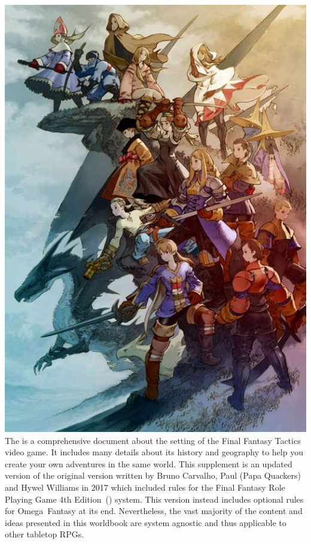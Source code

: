 %
\\\\
%
\includegraphics[width=\columnwidth]{./art/worldbook/everyone.jpg}
%
\ofrow
%
The  is a comprehensive document about the setting of the Final Fantasy Tactics video game.
It includes many details about its history and geography to help you create your own adventures in the same world.
This supplement is an updated version of the original version written by Bruno Carvalho, Paul (Papa Quackers) and Hywel Williams in 2017 which included rules for the Final Fantasy Role Playing Game 4th Edition~() system.
This version instead includes optional rules for Omega~Fantasy at its end.
Nevertheless, the vast majority of the content and ideas presented in this worldbook are system agnostic and thus applicable to other tabletop RPGs.
